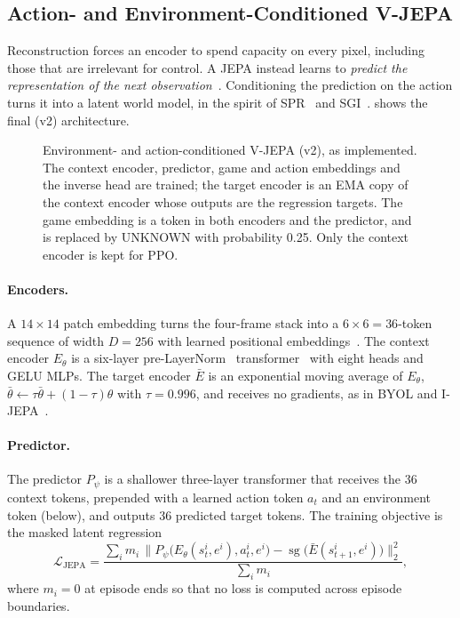 \documentclass[runningheads]{llncs}
\newcommand{\sg}{\operatorname{sg}}
\begin{document}
\subsection{Action- and Environment-Conditioned V-JEPA}
\label{sec:jepa}

Reconstruction forces an encoder to spend capacity on every pixel, including those that
are irrelevant for control. A JEPA instead learns to \emph{predict the representation of
the next observation}~\cite{lecun2022path}. Conditioning the prediction on the action
turns it into a latent world model, in the spirit of SPR~\cite{schwarzer2021spr} and
SGI~\cite{schwarzer2021sgi}.  shows the final (v2) architecture.

\begin{figure}[t]
\centering

\caption{Environment- and action-conditioned V-JEPA (v2), as implemented. The context
encoder, predictor, game and action embeddings and the inverse head are trained; the
target encoder is an EMA copy of the context encoder whose outputs are the regression
targets. The game embedding is a token in both encoders and the predictor, and is
replaced by UNKNOWN with probability 0.25. Only the context encoder is kept for PPO.}
\label{fig:jepa}
\end{figure}

\paragraph{Encoders.}
A $14\times14$ patch embedding turns the four-frame stack into a $6\times6=36$-token
sequence of width $D=256$ with learned positional embeddings~\cite{dosovitskiy2021vit}.
The context encoder $E_\theta$ is a six-layer pre-LayerNorm~\cite{xiong2020prenorm}
transformer~\cite{vaswani2017attention} with eight heads and GELU MLPs. The target
encoder $\bar E$ is an exponential moving average of $E_\theta$,
$\bar\theta\leftarrow\tau\bar\theta+(1-\tau)\theta$ with $\tau=0.996$, and receives no
gradients, as in BYOL and I-JEPA~\cite{grill2020byol,assran2023ijepa}.

\paragraph{Predictor.}
The predictor $P_\psi$ is a shallower three-layer transformer that receives the 36
context tokens, prepended with a learned action token $a_t$ and an environment token
(below), and outputs 36 predicted target tokens. The training objective is the masked
latent regression
\begin{equation}
  \mathcal{L}_{\text{JEPA}}=\frac{\sum_i m_i\,\big\|P_\psi\big(E_\theta(s_t^i,e^i),a_t^i,e^i\big)
  -\sg\big(\bar E(s_{t+1}^i,e^i)\big)\big\|_2^2}{\sum_i m_i},
\end{equation}
where $m_i=0$ at episode ends so that no loss is computed across episode boundaries.
\end{document}

